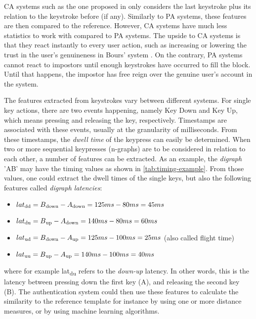 \documentclass[informationsecurity]{gucmasterproject}
\begin{document}
CA systems such as the one proposed in \cite{BOURS201236} only considers the last keystroke plus its relation to the keystroke before (if any).
Similarly to PA systems, these features are then compared to the reference. 
However, CA systems have much less statistics to work with compared to PA systems.
The upside to CA systems is that they react instantly to every user action, such as increasing or lowering the trust in the user's genuineness in Bours' system \cite{BOURS201236}.
On the contrary, PA systems cannot react to impostors until enough keystrokes have occurred to fill the block.
Until that happens, the impostor has free reign over the genuine user's account in the system.

The features extracted from keystrokes vary between different systems.
For single key actions, there are two events happening, namely Key Down and Key Up, which means pressing and releasing the key, respectively.
Timestamps are associated with these events, usually at the granularity of milliseconds.
From these timestamps, the \textit{dwell time} of the keypress can easily be determined.
When two or more sequential keypresses (n-graphs) are to be considered in relation to each other, a number of features can be extracted.
As an example, the \textit{digraph} 'AB' may have the timing values as shown in \cref{tab:timing-example}.
From those values, one could extract the dwell times of the single keys, but also the following features called \textit{digraph latencies}: 

\begin{itemize}
\item $lat\textsubscript{dd} = B\textsubscript{down}-A\textsubscript{down} = 125ms-80ms = 45ms$
\item $lat\textsubscript{du} = B\textsubscript{up}-A\textsubscript{down} = 140ms-80ms = 60ms$
\item $lat\textsubscript{ud} = B\textsubscript{down}-A\textsubscript{up} = 125ms-100ms=25ms$ (also called flight time)
\item $lat\textsubscript{uu} = B\textsubscript{up}-A\textsubscript{up} = 140ms-100ms=40ms$
\end{itemize}
where for example lat\textsubscript{du} refers to the \textit{down-up} latency.
In other words, this is the latency between pressing down the first key (A), and releasing the second key (B).
The authentication system could then use these features to calculate the similarity to the reference template for instance by using one or more distance measures, or by using machine learning algorithms.
\end{document}
